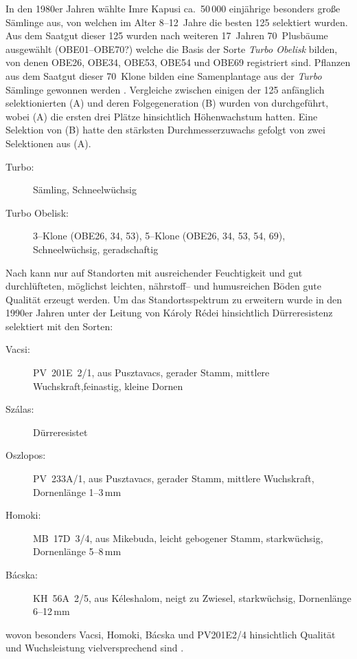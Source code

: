 \documentclass[twocolumn]{scrartcl}
\begin{document}
In den 1980er Jahren wählte Imre Kapusi ca.\ 50\,000 einjährige
besonders große Sämlinge aus, von welchen im Alter 8--12~Jahre die
besten 125 selektiert wurden. Aus dem Saatgut dieser 125 wurden nach
weiteren 17~Jahren 70~Plusbäume ausgewählt (OBE01--OBE70?) welche die
Basis der Sorte \emph{Turbo Obelisk} bilden, von denen OBE26, OBE34,
OBE53, OBE54 und OBE69 registriert sind.
Pflanzen aus dem Saatgut dieser 70~Klone bilden eine Samenplantage aus
der \emph{Turbo} Sämlinge gewonnen werden \citep{nemeth2022robinie}.
Vergleiche zwischen einigen der 125 anfänglich selektionierten (A) und
deren Folgegeneration (B) wurden von \citet{barna2009robinieTurbo}
durchgeführt, wobei (A) die ersten drei Plätze hinsichtlich
Höhenwachstum hatten. Eine Selektion von (B) hatte den stärksten
Durchmesserzuwachs gefolgt von zwei Selektionen aus (A).

\begin{description}
  \item[Turbo:] Sämling, Schneelwüchsig \citep{nemeth2022robinie}
  \item[Turbo Obelisk:] 3--Klone (OBE26, 34, 53), 5--Klone (OBE26, 34, 53, 54, 69), Schneelwüchsig, geradschaftig \citep{nemeth2022robinie}
\end{description}

Nach \citet{redei2008robinieImprovement} kann nur auf Standorten mit
ausreichender Feuchtigkeit und gut durchlüfteten, möglichst leichten,
nährstoff-- und humusreichen Böden gute Qualität erzeugt werden. Um
das Standortsspektrum zu erweitern wurde in
den 1990er Jahren unter der Leitung von Károly Rédei
hinsichtlich Dürreresistenz selektiert mit den Sorten:
\begin{description}
  \item[Vacsi:] PV~201E~2/1, aus Pusztavacs, gerader Stamm, mittlere Wuchskraft,feinastig, kleine Dornen
  \item[Szálas:] Dürreresistet
  \item[Oszlopos:] PV~233A/1, aus Pusztavacs, gerader Stamm, mittlere Wuchskraft, Dornenlänge 1--3\,mm
  \item[Homoki:] MB~17D~3/4, aus Mikebuda, leicht gebogener Stamm, starkwüchsig, Dornenlänge 5--8\,mm
  \item[Bácska:] KH~56A~2/5, aus Kéleshalom, neigt zu Zwiesel, starkwüchsig, Dornenlänge 6--12\,mm
\end{description}
wovon besonders Vacsi, Homoki, Bácska und PV201E2/4 hinsichtlich Qualität und Wuchsleistung vielversprechend
sind \citep{redei2018robinieImprovement,keserue2021robinie,abri2023robinieUngarn,abri2024dis}.
\end{document}
